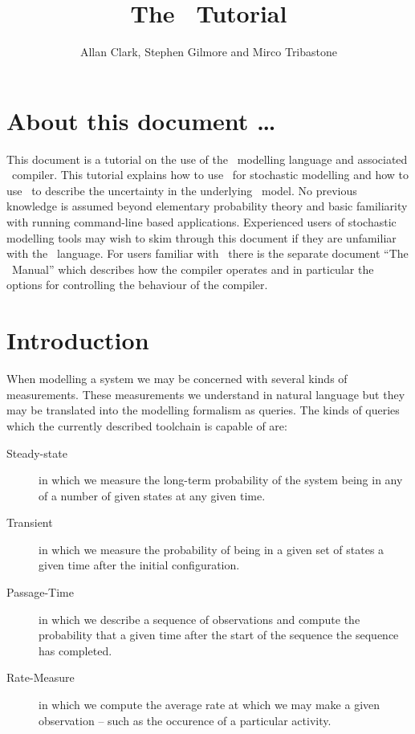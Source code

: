 \documentclass[10pt,a4paper]{article}
\title{The \srmc\ Tutorial}
\author{
Allan Clark, Stephen Gilmore and Mirco Tribastone
}
\begin{document}
\maketitle


\newcommand{\esyntaxlabel}[1]{
( #1 )
}

\newcommand{\esyntaxtopline}[3]{
$ #1 $ & $ := $ & $ #2 $ & \esyntaxlabel{ #3 }
}
\newcommand{\esyntaxline}[2]{
& $ \mid $ & $ #1 $ &  \esyntaxlabel{ #2 }
}

\section*{About this document \ldots}

This document is a tutorial on the use of the
\srmc\ modelling language and associated \smc\ compiler.
This tutorial explains how to use \pepa\ for stochastic modelling
and how to use \srmc\ to describe the uncertainty in the 
underlying \pepa\ model.
No previous knowledge is assumed beyond elementary probability
theory and basic familiarity with running command-line based
applications. Experienced users of stochastic modelling tools
may wish to skim through this document if they are unfamiliar
with the \srmc\ language. For users familiar with \srmc\ there
is the separate document ``The \srmc\ Manual'' which describes
how the compiler operates and in particular the options for
controlling the behaviour of the compiler.

\section{Introduction}
When modelling a system we may be concerned with several kinds of
measurements. These measurements we understand in natural language
but they may be translated into the modelling formalism as queries.
The kinds of queries which the currently described toolchain is capable
of are:
\begin{description}
\item [Steady-state] in which we measure the long-term probability
of the system being in any of a number of given states at any given time.
\item [Transient] in which we measure the probability of being in a given
set of states a given time after the initial configuration.
\item [Passage-Time] in which we describe a sequence of observations and
compute the probability that a given time after the start of the sequence
the sequence has completed. 
\item [Rate-Measure] in which we compute the average rate at which we
may make a given observation -- such as the occurence of a particular
activity.
\end{description}
\end{document}
